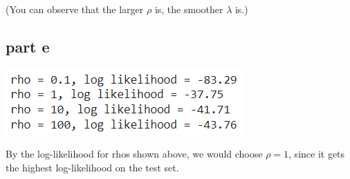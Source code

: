 \documentclass{uofa-eng-assignment}
\begin{document}
(You can observe that the larger $\rho$ is, the smoother
$\lambda$ is.)

\subsection*{part e}

\begin{center}
	\includegraphics[width=0.5\linewidth]{screenshot002}
\end{center}
By the log-likelihood for rhos shown above,
we would choose $\rho = 1$, since it gets the highest log-likelihood on the test set.
\end{document}
